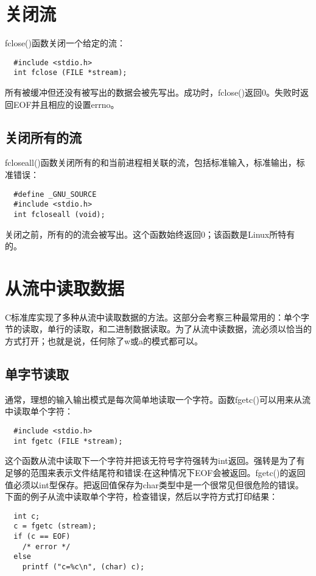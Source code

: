 \section{关闭流}

fclose()函数关闭一个给定的流：
\begin{lstlisting}
  #include <stdio.h>
  int fclose (FILE *stream);
\end{lstlisting}


所有被缓冲但还没有被写出的数据会被先写出。成功时，fclose()返回0。失败时返回EOF并且相应的设置errno。

\subsection{关闭所有的流}

fcloseall()函数关闭所有的和当前进程相关联的流，包括标准输入，标准输出，标准错误：
\begin{lstlisting}
  #define _GNU_SOURCE
  #include <stdio.h>
  int fcloseall (void);
\end{lstlisting}

关闭之前，所有的的流会被写出。这个函数始终返回0；该函数是Linux所特有的。 

\section{从流中读取数据}

C标准库实现了多种从流中读取数据的方法。这部分会考察三种最常用的：单个字节的读取，单行的读取，和二进制数据读取。为了从流中读数据，流必须以恰当的方式打开；也就是说，任何除了w或a的模式都可以。

\subsection{单字节读取}

通常，理想的输入输出模式是每次简单地读取一个字符。函数fgetc()可以用来从流中读取单个字符：
\begin{lstlisting}
  #include <stdio.h>
  int fgetc (FILE *stream);
\end{lstlisting}

这个函数从流中读取下一个字符并把该无符号字符强转为int返回。强转是为了有足够的范围来表示文件结尾符和错误:在这种情况下EOF会被返回。fgetc()的返回值必须以int型保存。把返回值保存为char类型中是一个很常见但很危险的错误。下面的例子从流中读取单个字符，检查错误，然后以字符方式打印结果：
\begin{lstlisting}
  int c;
  c = fgetc (stream);
  if (c == EOF)
    /* error */
  else
    printf ("c=%c\n", (char) c);
\end{lstlisting}

